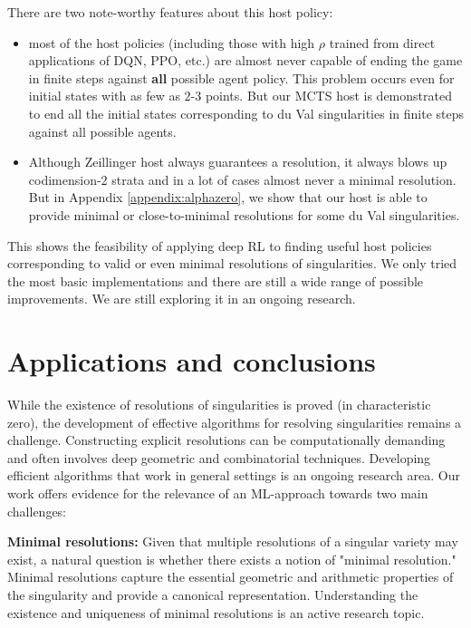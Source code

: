 \documentclass{article}
\theoremstyle{plain}
\theoremstyle{definition}
\theoremstyle{remark}
\begin{document}
There are two note-worthy features about this host policy:
\begin{itemize}
    \item most of the host policies (including those with high $\rho$ trained from direct applications of DQN, PPO, etc.) are almost never capable of ending the game in finite steps against {\bf all} possible agent policy. This problem occurs even for initial states with as few as $2$-$3$ points. But our MCTS host is demonstrated to end all the initial states corresponding to du Val singularities in finite steps against all possible agents.
    \item Although Zeillinger host always guarantees a resolution, it always blows up codimension-$2$ strata and in a lot of cases almost never a minimal resolution. But in Appendix \ref{appendix:alphazero}, we show that our host is able to provide minimal or close-to-minimal resolutions for some du Val singularities. 
\end{itemize}

This shows the feasibility of applying deep RL to finding useful host policies corresponding to valid or even minimal resolutions of singularities. We only tried the most basic implementations and there are still a wide range of possible improvements. We are still exploring it in an ongoing research.

\section{Applications and conclusions}\label{applications}

While the existence of resolutions of singularities is proved (in characteristic zero), the development of effective algorithms for resolving singularities remains a challenge. Constructing explicit resolutions can be computationally demanding and often involves deep geometric and combinatorial techniques. Developing efficient algorithms that work in general settings is an ongoing research area. Our work offers evidence for the relevance of an ML-approach towards two main challenges: 

\textbf{Minimal resolutions:} Given that multiple resolutions of a singular variety may exist, a natural question is whether there exists a notion of "minimal resolution." Minimal resolutions capture the essential geometric and arithmetic properties of the singularity and provide a canonical representation. Understanding the existence and uniqueness of minimal resolutions is an active research topic.
\end{document}

